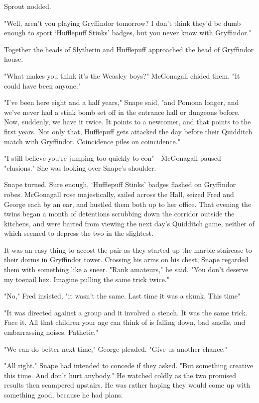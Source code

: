 Sprout nodded.

"Well, aren't you playing Gryffindor tomorrow? I don't think they'd be dumb enough to sport `Hufflepuff Stinks' badges, but you never know with Gryffindor."

Together the heads of Slytherin and Hufflepuff approached the head of Gryffindor house.

"What makes you think it's the Weasley boys?" McGonagall chided them. "It could have been anyone."

"I've been here eight and a half years," Snape said, "and Pomona longer, and we've never had a stink bomb set off in the entrance hall or dungeons before. Now, suddenly, we have it twice. It points to a newcomer, and that points to the first years. Not only that, Hufflepuff gets attacked the day before their Quidditch match with Gryffindor. Coincidence piles on coincidence."

"I still believe you're jumping too quickly to con{\el}" - McGonagall paused - "{\el}clusions." She was looking over Snape's shoulder.

Snape turned. Sure enough, `Hufflepuff Stinks' badges flashed on Gryffindor robes. McGonagall rose majestically, sailed across the Hall, seized Fred and George each by an ear, and hustled them both up to her office. That evening the twins began a month of detentions scrubbing down the corridor outside the kitchens, and were barred from viewing the next day's Quidditch game, neither of which seemed to depress the two in the slightest.

It was an easy thing to accost the pair as they started up the marble staircase to their dorms in Gryffindor tower. Crossing his arms on his chest, Snape regarded them with something like a sneer. "Rank amateurs," he said. "You don't deserve my toenail hex. Imagine pulling the same trick twice."

"No," Fred insisted, "it wasn't the same. Last time it was a skunk. This time{\el}"

"It was directed against a group and it involved a stench. It was the same trick. Face it. All that children your age can think of is falling down, bad smells, and embarrassing noises. Pathetic."

"We can do better next time," George pleaded. "Give us another chance."

"All right." Snape had intended to concede if they asked. "But something creative this time. And don't hurt anybody." He watched coldly as the two promised results then scampered upstairs. He was rather hoping they would come up with something good, because he had plans.

